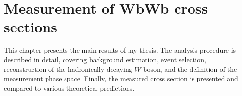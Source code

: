 \chapter{Measurement of WbWb cross sections}%
\label{ch:WbWb}

This chapter presents the main results of my thesis. The analysis procedure is described in detail, covering background estimation, event selection, reconstruction of the hadronically decaying $W$ boson, and the definition of the measurement phase space. Finally, the measured cross section is presented and compared to various theoretical predictions.